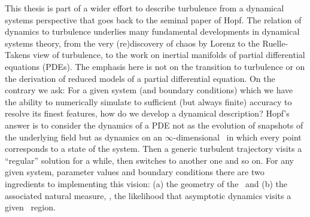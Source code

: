 


%




This thesis is part of a wider effort to describe
turbulence from a dynamical systems perspective that goes back
to the seminal paper of Hopf. The relation of
dynamics to turbulence underlies many fundamental developments
in dynamical systems theory, from the very (re)discovery of
chaos by Lorenz to the Ruelle-Takens
view of turbulence, to the work on inertial
manifolds of partial differential
equations (PDEs). The emphasis here is not on the transition to
turbulence or on the derivation of reduced models of a partial
differential equation. On the contrary we ask: For a given
system (and boundary conditions) which we have the ability to
numerically simulate to sufficient (but always finite) accuracy
to resolve its finest features, how do we develop a dynamical
description? Hopf's answer
is to consider the dynamics of a PDE not as the evolution of
snapshots of the underlying field but as dynamics on an
$\infty$-dimensional \statesp\ in which every point
corresponds to a state of the system. Then a generic turbulent
trajectory visits a ``regular'' solution for a while, then
switches to another one and so on. For any given system,
parameter values and boundary conditions there are two
ingredients to implementing this vision: (a) the geometry of
the \statesp\ and (b) the associated natural measure, \ie, the
likelihood that asymptotic dynamics visits a given \statesp\
region.

